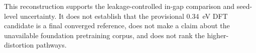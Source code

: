 This reconstruction supports the leakage-controlled in-gap comparison and seed-level uncertainty. It does not establish that the provisional 0.34~eV DFT candidate is a final converged reference, does not make a claim about the unavailable foundation pretraining corpus, and does not rank the higher-distortion pathways.
